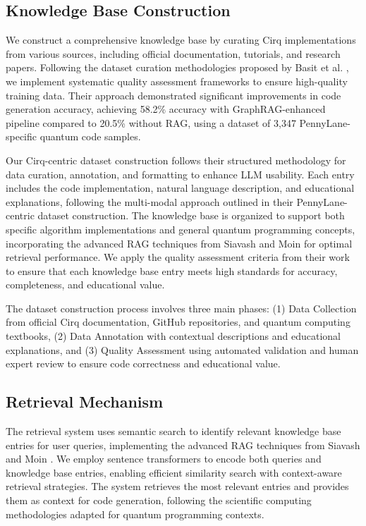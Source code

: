\documentclass[runningheads]{llncs}
\begin{document}
\subsection{Knowledge Base Construction}
We construct a comprehensive knowledge base by curating Cirq implementations from various sources, including official documentation, tutorials, and research papers. Following the dataset curation methodologies proposed by Basit et al. \cite{basit2025pennylangpioneeringllmbasedquantum}, we implement systematic quality assessment frameworks to ensure high-quality training data. Their approach demonstrated significant improvements in code generation accuracy, achieving 58.2\% accuracy with GraphRAG-enhanced pipeline compared to 20.5\% without RAG, using a dataset of 3,347 PennyLane-specific quantum code samples.

Our Cirq-centric dataset construction follows their structured methodology for data curation, annotation, and formatting to enhance LLM usability. Each entry includes the code implementation, natural language description, and educational explanations, following the multi-modal approach outlined in their PennyLane-centric dataset construction. The knowledge base is organized to support both specific algorithm implementations and general quantum programming concepts, incorporating the advanced RAG techniques from Siavash and Moin \cite{siavash2025modeldrivenquantumcodegeneration} for optimal retrieval performance. We apply the quality assessment criteria from their work to ensure that each knowledge base entry meets high standards for accuracy, completeness, and educational value.

The dataset construction process involves three main phases: (1) Data Collection from official Cirq documentation, GitHub repositories, and quantum computing textbooks, (2) Data Annotation with contextual descriptions and educational explanations, and (3) Quality Assessment using automated validation and human expert review to ensure code correctness and educational value.

\subsection{Retrieval Mechanism}
The retrieval system uses semantic search to identify relevant knowledge base entries for user queries, implementing the advanced RAG techniques from Siavash and Moin \cite{siavash2025modeldrivenquantumcodegeneration}. We employ sentence transformers to encode both queries and knowledge base entries, enabling efficient similarity search with context-aware retrieval strategies. The system retrieves the most relevant entries and provides them as context for code generation, following the scientific computing methodologies adapted for quantum programming contexts.
\end{document}
